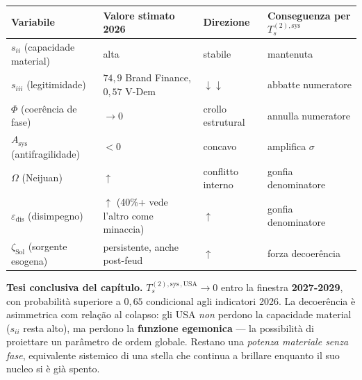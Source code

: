 {\def\LTcaptype{none} %
{\small\begin{longtable}[]{@{}
  >{\raggedright\arraybackslash}p{}
  >{\raggedright\arraybackslash}p{}
  >{\raggedright\arraybackslash}p{}
  >{\raggedright\arraybackslash}p{}@{}}
\toprule\noalign{}
\begin{minipage}[b]{\linewidth}\raggedright
Variabile
\end{minipage} & \begin{minipage}[b]{\linewidth}\raggedright
Valore stimato 2026
\end{minipage} & \begin{minipage}[b]{\linewidth}\raggedright
Direzione
\end{minipage} & \begin{minipage}[b]{\linewidth}\raggedright
Conseguenza per \(T_s^{(2),\text{sys}}\)
\end{minipage} \\
\midrule\noalign{}
\endhead
\bottomrule\noalign{}
\endlastfoot
\(s_{ii}\) (capacidade material) & alta & stabile & mantenuta \\
\(s_{iii}\) (legitimidade) & \(74{,}9\) Brand Finance, \(0{,}57\) V-Dem &
\(\downarrow\downarrow\) & abbatte numeratore \\
\(\Phi\) (coerência de fase) & \(\to 0\) & crollo estrutural & annulla
numeratore \\
\(A_{\text{sys}}\) (antifragilidade) & \(< 0\) & concavo & amplifica
\(\sigma\) \\
\(\Omega\) (Neijuan) & \(\uparrow\) & conflitto interno & gonfia
denominatore \\
\(\varepsilon_{\text{dis}}\) (disimpegno) & \(\uparrow\) (40\%+ vede
l'altro come minaccia) & \(\uparrow\) & gonfia denominatore \\
\(\zeta_{\text{Sol}}\) (sorgente esogena) & persistente, anche post-feud
& \(\uparrow\) & forza decoerência \\
\end{longtable}}
}

\Hypoth{} \textbf{Tesi conclusiva del capítulo.}
\(T_s^{(2),\text{sys}\,,\text{USA}} \to 0\) entro la finestra
\textbf{2027-2029}, con probabilità superiore a \(0{,}65\) condicional
agli indicatori 2026. La decoerência è asimmetrica com relação al colapso:
gli USA \emph{non} perdono la capacidade material (\(s_{ii}\) resta
alto), ma perdono la \textbf{funzione egemonica} --- la possibilità di
proiettare un parâmetro de ordem globale. Restano una \emph{potenza
materiale senza fase}, equivalente sistemico di una stella che continua
a brillare enquanto il suo nucleo si è già spento.



